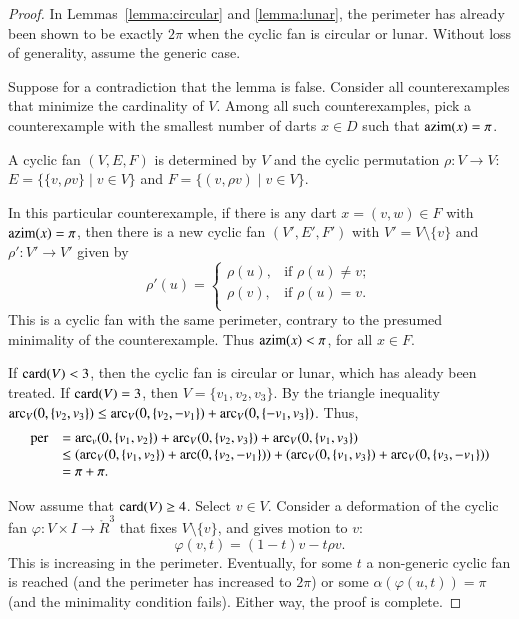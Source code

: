 \begin{proof} In Lemmas~\ref{lemma:circular} and \ref{lemma:lunar}, the perimeter has already been shown to be exactly $2\pi$ when the cyclic fan is circular or lunar.  Without loss of generality, assume the generic case.

Suppose for a contradiction that the lemma is false.  Consider all counterexamples
that minimize the cardinality of $V$.  Among all such counterexamples, pick a counterexample with the smallest number of darts $x\in D$ such that ${\operatorname{azim}}(x) = \pi$.

A cyclic fan $(V,E,F)$ is determined by $V$ and the cyclic permutation $\rho:V\to V$:  $E=\{\{v,\rho v\}\mid v\in V\}$ and $F = \{(v,\rho v)\mid v\in V\}$.

In this particular counterexample, if there is any dart $x=(v,w)\in F$ with ${\operatorname{azim}}(x)=\pi$, then there is a new cyclic fan $(V',E',F')$ with $V' = V\setminus\{v\}$ and $\rho':V'\to V'$ given by 
$$
\rho'(u) = \begin{cases}
\rho(u), & \text{if } \rho(u)\ne v;\\
\rho(v), & \text{if }\rho(u) = v.\\
\end{cases}
$$
This is a cyclic fan with the same perimeter, contrary to the presumed minimality of the counterexample.  Thus ${\operatorname{azim}}(x) <\pi$, for all $x\in F$.

If ${\operatorname{card}}(V) <3$, then the cyclic fan is circular or lunar, which has aleady been treated.  If ${\operatorname{card}}(V)=3$, then $V=\{v_1,v_2,v_3\}$.  By the triangle inequality $\operatorname{arc}_V(0,\{v_2,v_3\}) \le \operatorname{arc}_V(0,\{v_2,-v_1\})+\operatorname{arc}_V(0,\{-v_1,v_3\})$.  Thus,
$$
\begin{array}{rll}
{\operatorname{per}} &=\operatorname{arc}_v(0,\{v_1,v_2\}) + \operatorname{arc}_V(0,\{v_2,v_3\}) + \operatorname{arc}_V(0,\{v_1,v_3\})\\
&\le(\operatorname{arc}_V(0,\{v_1,v_2\})+\operatorname{arc}(0,\{v_2,-v_1\}))+(\operatorname{arc}_V(0,\{v_1,v_3\})+\operatorname{arc}_V(0,\{v_3,-v_1\})) \\
   &= \pi+\pi.
\end{array}
$$

Now assume that ${\operatorname{card}}(V)\ge 4$.  Select $v\in V$.  Consider a deformation of the cyclic fan $\varphi:V\times I \to \ring{R}^3$ that fixes $V\setminus\{v\}$, and gives motion to $v$:
$$
\varphi(v,t) = (1-t) v - t \rho v.
$$
This is increasing in the perimeter.  Eventually, for some $t$ a non-generic cyclic fan is reached (and the perimeter has increased to $2\pi$) or some $\alpha(\varphi(u,t))=\pi$ (and the minimality condition fails).  Either way, the proof is complete. 
\end{proof}

